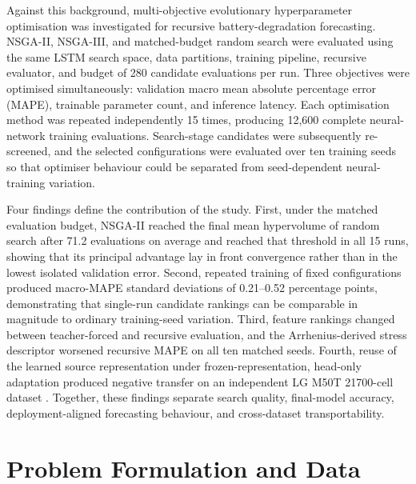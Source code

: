\documentclass[a4paper,fleqn]{cas-sc}
\begin{document}
Against this background, multi-objective evolutionary hyperparameter optimisation was investigated for recursive battery-degradation forecasting. NSGA-II, NSGA-III, and matched-budget random search were evaluated using the same LSTM search space, data partitions, training pipeline, recursive evaluator, and budget of 280 candidate evaluations per run. Three objectives were optimised simultaneously: validation macro mean absolute percentage error (MAPE), trainable parameter count, and inference latency. Each optimisation method was repeated independently 15 times, producing 12,600 complete neural-network training evaluations. Search-stage candidates were subsequently re-screened, and the selected configurations were evaluated over ten training seeds so that optimiser behaviour could be separated from seed-dependent neural-training variation.

Four findings define the contribution of the study. First, under the matched evaluation budget, NSGA-II reached the final mean hypervolume of random search after 71.2 evaluations on average and reached that threshold in all 15 runs, showing that its principal advantage lay in front convergence rather than in the lowest isolated validation error. Second, repeated training of fixed configurations produced macro-MAPE standard deviations of 0.21--0.52 percentage points, demonstrating that single-run candidate rankings can be comparable in magnitude to ordinary training-seed variation. Third, feature rankings changed between teacher-forced and recursive evaluation, and the Arrhenius-derived stress descriptor worsened recursive MAPE on all ten matched seeds. Fourth, reuse of the learned source representation under frozen-representation, head-only adaptation produced negative transfer on an independent LG M50T 21700-cell dataset \cite{kirkaldy2024dataset}. Together, these findings separate search quality, final-model accuracy, deployment-aligned forecasting behaviour, and cross-dataset transportability.


\section{Problem Formulation and Data}
\label{sec:problem_data}

\end{document}

